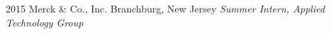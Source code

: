 \documentclass[]{friggeri-mlg-cv} %
\begin{document}
\begin{entrylist}
{\begin{itemize}[leftmargin=*]
\end{itemize}}
\entry
{2015}
{Merck \& Co., Inc.}
{Branchburg, New Jersey}
{\emph{Summer Intern, Applied Technology Group}
}
\end{entrylist}
%
\end{document}
